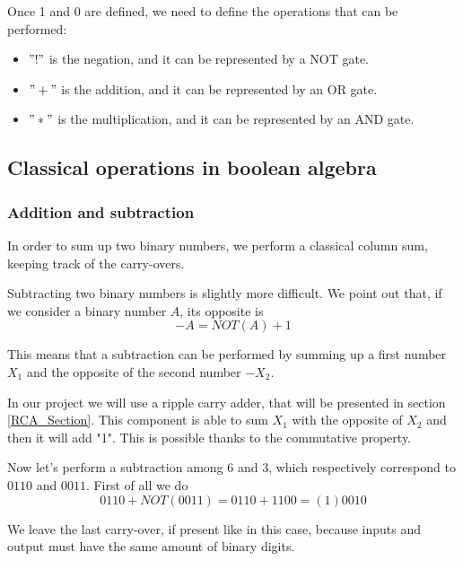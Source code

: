 \documentclass{article}
\begin{document}
\vspace{3mm}

Once 1 and 0 are defined, we need to define the operations that can be performed:

\begin{itemize}
\item $"!"$ is the negation, and it can be represented by a NOT gate.
\item $"+"$ is the addition, and it can be represented by an OR gate.
\item $"*"$ is the multiplication, and it can be represented by an AND gate.
\end{itemize}



\subsection{Classical operations in boolean algebra}

\subsubsection{Addition and subtraction}

In order to sum up two binary numbers, we perform a classical column sum, keeping track of the carry-overs.

\vspace{5mm}

Subtracting two binary numbers is slightly more difficult. We point out that, if we consider a binary number $A$, its opposite is
\[-A=NOT(A)+1\]

This means that a subtraction can be performed by summing up a first number $X_1$ and the opposite of the second number $-X_2$. 

\vspace{3mm}

In our project we will use a ripple carry adder, that will be presented in section \ref{RCA_Section}. This component is able to sum $X_1$ with the opposite of $X_2$ and then it will add "1". This is possible thanks to the commutative property.

\vspace{3mm}

Now let's perform a subtraction among $6$ and $3$, which respectively correspond to $0110$ and $0011$. First of all we do
\[0110+NOT(0011) = 0110 + 1100 = (1)0010\]

We leave the last carry-over, if present like in this case, because inputs and output must have the same amount of binary digits.
\end{document}
